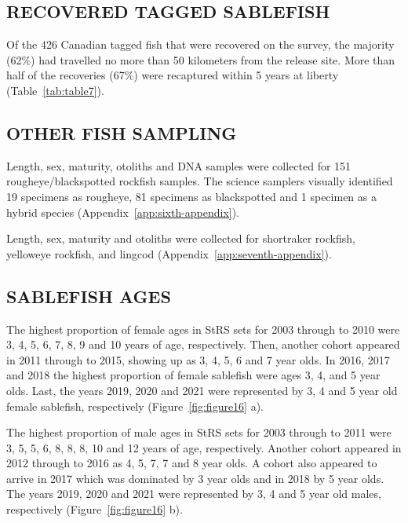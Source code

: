 \documentclass[12pt]{article}\usepackage[]{graphicx}\usepackage[]{color}
\begin{document}
\hypertarget{recovered-tagged-sablefish}{%
\subsection{RECOVERED TAGGED SABLEFISH}\label{recovered-tagged-sablefish}}

Of the 426 Canadian tagged fish that were recovered on the survey, the majority (62\%) had travelled no more than 50 kilometers from the release site. More than half of the recoveries (67\%) were recaptured within 5 years at liberty (Table~\ref{tab:table7}).

\hypertarget{other-fish-sampling}{%
\subsection{OTHER FISH SAMPLING}\label{other-fish-sampling}}

Length, sex, maturity, otoliths and DNA samples were collected for 151 rougheye/blackspotted rockfish samples. The science samplers visually identified 19 specimens as rougheye, 81 specimens as blackspotted and 1 specimen as a hybrid species (Appendix~\ref{app:sixth-appendix}).

Length, sex, maturity and otoliths were collected for shortraker rockfish, yelloweye rockfish, and lingcod (Appendix~\ref{app:seventh-appendix}).

\hypertarget{sablefish-ages}{%
\subsection{SABLEFISH AGES}\label{sablefish-ages}}

The highest proportion of female ages in StRS sets for 2003 through to 2010 were 3, 4, 5, 6, 7, 8, 9 and 10 years of age, respectively. Then, another cohort appeared in 2011 through to 2015, showing up as 3, 4, 5, 6 and 7 year olds. In 2016, 2017 and 2018 the highest proportion of female sablefish were ages 3, 4, and 5 year olds. Last, the years 2019, 2020 and 2021 were represented by 3, 4 and 5 year old female sablefish, respectively (Figure~\ref{fig:figure16} a).

The highest proportion of male ages in StRS sets for 2003 through to 2011 were 3, 5, 5, 6, 8, 8, 8, 10 and 12 years of age, respectively. Another cohort appeared in 2012 through to 2016 as 4, 5, 7, 7 and 8 year olds. A cohort also appeared to arrive in 2017 which was dominated by 3 year olds and in 2018 by 5 year olds. The years 2019, 2020 and 2021 were represented by 3, 4 and 5 year old males, respectively (Figure~\ref{fig:figure16} b).
\end{document}
